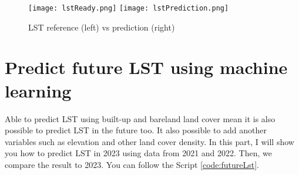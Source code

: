 \begin{figure}[htbp]
	\label{fig:lstReferenceVsPrediction}
	\centering
	\texttt{[image: lstReady.png]}
	\texttt{[image: lstPrediction.png]}
	\caption{LST reference (left) vs prediction (right)}
\end{figure}

\section{Predict future LST using machine learning}
Able to predict LST using built-up and bareland land cover mean it is also possible to predict LST in the future too. It also possible to add another variables such as elevation and other land cover density. In this part, I will show you how to predict LST in 2023 using data from 2021 and 2022. Then, we compare the result to 2023. You can follow the Script \ref{code:futureLst}.


